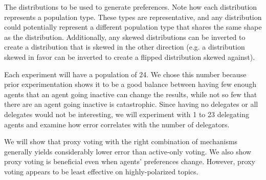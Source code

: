 \begin{table}[!htbp]
    \renewcommand{\arraystretch}{1.3}

    \caption{
        The distributions to be used to generate preferences.
        Note how each distribution represents a population type.
        These types are representative, and any distribution could potentially
        represent a different population type that shares the same shape as the
        distribution.
        Additionally, any skewed distributions can be inverted to create a
        distribution that is skewed in the other direction (e.g. a distribution
        skewed in favor can be inverted to create a flipped distribution skewed
        against).
    }
    \label{tab:distributions-used}

    \centering
    
\end{table}

Each experiment will have a population of 24.
We chose this number because prior experimentation shows it to be a good balance
between having few enough agents that an agent going inactive can change the
results, while not so few that there are an agent going inactive is catastrophic.
Since having no delegates or all delegates would not be interesting, we will
experiment with 1 to 23 delegating agents and examine how error correlates with
the number of delegators.

We will show that proxy voting with the right combination of mechanisms generally
yields considerably lower error than active-only voting.
We also show proxy voting is beneficial even when agents' preferences change.
However, proxy voting appears to be least effective on highly-polarized topics.
